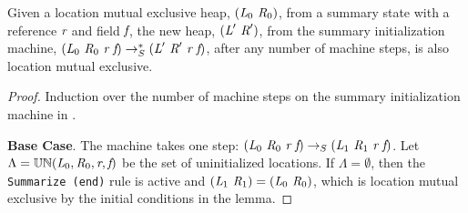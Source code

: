 \begin{lemma}
Given a location mutual exclusive heap, $(\emph{L}_0\ \emph{R}_0)$, from a
summary state with a reference $\emph{r}$ and field $\emph{f}$, the
new heap, $(\emph{L}^\prime\ \emph{R}^\prime)$, from the summary
initialization machine, $(\emph{L}_0\ \emph{R}_0\ \emph{r}\ \emph{f})
\rightarrow^*_S
(\emph{L}^\prime\ \emph{R}^\prime\ \emph{r}\ \emph{f})$, after any number of machine steps, is also
location mutual exclusive.
\end{lemma}
\begin{proof}
Induction over the number of machine steps on the summary initialization machine in .

\noindent\textbf{Base Case}. The machine takes one step: $(\emph{L}_0\ \emph{R}_0\ \emph{r}\ \emph{f})
\rightarrow_S
(\emph{L}_1\ \emph{R}_1\ \emph{r}\ \emph{f})$. Let $\Lambda = \mathbb{UN}(\emph{L}_0, \emph{R}_0, \emph{r},
\emph{f})$ be the set of uninitialized locations. If $\Lambda = \emptyset$, then the \texttt{Summarize (end)}
rule is active and $(\cfgnt{L}_1\ \cfgnt{R}_1) = (\cfgnt{L}_0\ \cfgnt{R}_0)$, which is location mutual exclusive by the initial conditions in the lemma.


\end{proof}
